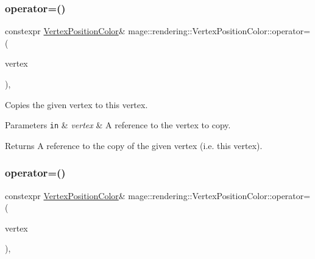 \subsubsection{\texorpdfstring{operator=()}{operator=()}\hspace{0.1cm}{\footnotesize\ttfamily [1/2]}}
{\footnotesize\ttfamily constexpr \mbox{\hyperlink{structmage_1_1rendering_1_1_vertex_position_color}{Vertex\+Position\+Color}}\& mage\+::rendering\+::\+Vertex\+Position\+Color\+::operator= (\begin{DoxyParamCaption}\item[{const \mbox{\hyperlink{structmage_1_1rendering_1_1_vertex_position_color}{Vertex\+Position\+Color}} \&}]{vertex }\end{DoxyParamCaption})\hspace{0.3cm}{\ttfamily [default]}, {\ttfamily [noexcept]}}

Copies the given vertex to this vertex.


\begin{DoxyParams}[1]{Parameters}
\mbox{\tt in}  & {\em vertex} & A reference to the vertex to copy. \\
\hline
\end{DoxyParams}
\begin{DoxyReturn}{Returns}
A reference to the copy of the given vertex (i.\+e. this vertex). 
\end{DoxyReturn}
\mbox{\label{structmage_1_1rendering_1_1_vertex_position_color_afd66f27ff1c0a372f729960260b4decd}} 
\subsubsection{\texorpdfstring{operator=()}{operator=()}\hspace{0.1cm}{\footnotesize\ttfamily [2/2]}}
{\footnotesize\ttfamily constexpr \mbox{\hyperlink{structmage_1_1rendering_1_1_vertex_position_color}{Vertex\+Position\+Color}}\& mage\+::rendering\+::\+Vertex\+Position\+Color\+::operator= (\begin{DoxyParamCaption}\item[{\mbox{\hyperlink{structmage_1_1rendering_1_1_vertex_position_color}{Vertex\+Position\+Color}} \&\&}]{vertex }\end{DoxyParamCaption})\hspace{0.3cm}{\ttfamily [default]}, {\ttfamily [noexcept]}}

